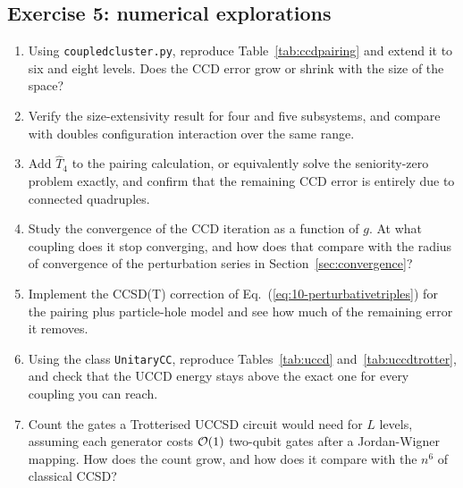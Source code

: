 \subsection*{Exercise 5: numerical explorations}
\label{ex:10-numerical}

\begin{enumerate}
  \item[a)] Using \texttt{coupledcluster.py}, reproduce
  Table~\ref{tab:ccdpairing} and extend it to six and eight levels.  Does the
  CCD error grow or shrink with the size of the space?
  \item[b)] Verify the size-extensivity result for four and five subsystems,
  and compare with doubles configuration interaction over the same range.
  \item[c)] Add $\hat{T}_4$ to the pairing calculation, or equivalently solve
  the seniority-zero problem exactly, and confirm that the remaining CCD
  error is entirely due to connected quadruples.
  \item[d)] Study the convergence of the CCD iteration as a function of $g$.
  At what coupling does it stop converging, and how does that compare with
  the radius of convergence of the perturbation series in
  Section~\ref{sec:convergence}?
  \item[e)] Implement the CCSD(T) correction of
  Eq.~(\ref{eq:10-perturbativetriples}) for the pairing plus particle-hole
  model and see how much of the remaining error it removes.
  \item[f)] Using the class \texttt{UnitaryCC}, reproduce
  Tables~\ref{tab:uccd} and~\ref{tab:uccdtrotter}, and check that the UCCD
  energy stays above the exact one for every coupling you can reach.
  \item[g)] Count the gates a Trotterised UCCSD circuit would need for $L$
  levels, assuming each generator costs $\mathcal{O}(1)$ two-qubit gates after a
  Jordan-Wigner mapping.  How does the count grow, and how does it compare
  with the $n^6$ of classical CCSD?
\end{enumerate}

